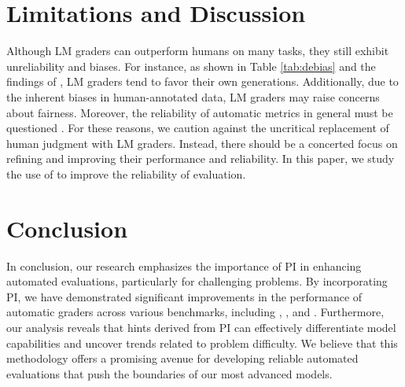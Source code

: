 \section{Limitations and Discussion}
Although LM graders can outperform humans on many tasks, they still exhibit unreliability and biases. For instance, as shown in Table \ref{tab:debias} and the findings of \citet{PanicksseryUnknown-wr}, LM graders tend to favor their own generations. Additionally, due to the inherent biases in human-annotated data, LM graders may raise concerns about fairness. Moreover, the reliability of automatic metrics in general must be questioned \citep{Doostmohammadi2024-ci,Boubdir2023-ek}. For these reasons, we caution against the uncritical replacement of human judgment with LM graders. Instead, there should be a concerted focus on refining and improving their performance and reliability. In this paper, we study the use of \PI to improve the reliability of evaluation.

\section{Conclusion}\label{sec:conclusion}
In conclusion, our research emphasizes the importance of PI in enhancing automated evaluations, particularly for challenging \NS problems.
By incorporating PI, we have demonstrated significant improvements in the performance of automatic graders across various benchmarks, including \RewardBench, \VibeEval, and \MathOdyssey.
Furthermore, our analysis reveals that hints derived from PI can effectively differentiate model capabilities and uncover trends related to problem difficulty.
We believe that this methodology offers a promising avenue for developing reliable automated evaluations that push the boundaries of our most advanced models.
